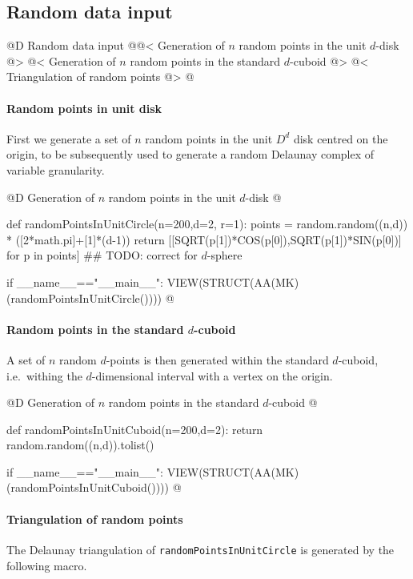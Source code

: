 \documentclass[11pt,oneside]{article}	%
\begin{document}
\subsection{Random data input} 

@D Random data input 
@{@< Generation of $n$ random points in the unit $d$-disk @>
@< Generation of $n$ random points in the standard $d$-cuboid @>
@< Triangulation of random points @>
@}

\paragraph{Random points in unit disk} 
First we generate a  set of $n$ random points in the unit $D^d$ disk centred on the origin, to be subsequently used to generate a random Delaunay complex of variable granularity.

@D Generation of $n$ random points in the unit $d$-disk 
@{def randomPointsInUnitCircle(n=200,d=2, r=1):
	points = random.random((n,d)) * ([2*math.pi]+[1]*(d-1))
	return [[SQRT(p[1])*COS(p[0]),SQRT(p[1])*SIN(p[0])] for p in points]
	## TODO: correct for $d$-sphere

if __name__=="__main__":
	VIEW(STRUCT(AA(MK)(randomPointsInUnitCircle()))) 
@}

\paragraph{Random points in the standard $d$-cuboid} 
A set of $n$ random $d$-points is then generated within the standard $d$-cuboid, i.e.~withing the $d$-dimensional interval with a vertex on the origin.

@D Generation of $n$ random points in the standard $d$-cuboid 
@{def randomPointsInUnitCuboid(n=200,d=2):
	return random.random((n,d)).tolist()

if __name__=="__main__":
	VIEW(STRUCT(AA(MK)(randomPointsInUnitCuboid()))) 
@}



\paragraph{Triangulation of random points} The Delaunay triangulation of \texttt{randomPointsInUnitCircle} is generated by the following macro.
\end{document}
